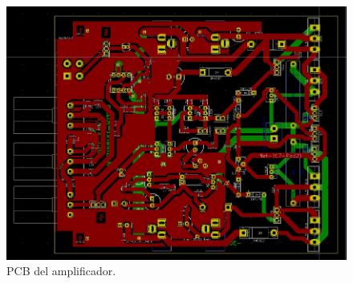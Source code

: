 \begin{figure}[H]
        \centering
        \includegraphics[scale=0.4]{img/circuito/PCB1.jpeg}
        \caption{PCB del amplificador.}
        \label{fig::amp_PCB1}
\end{figure}


